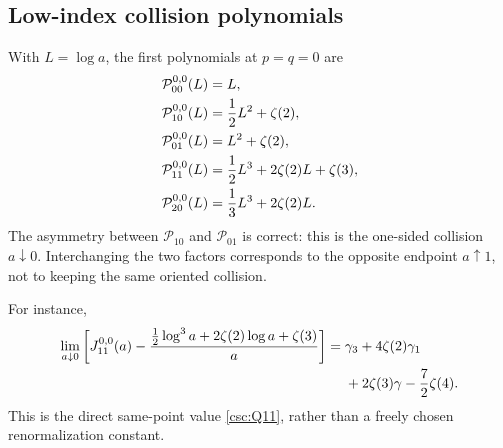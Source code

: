 \documentclass[11pt,a4paper]{article}
\numberwithin{equation}{section}
\theoremstyle{definition}
\begin{document}
\subsection{Low-index collision polynomials}
With $L=\log a$, the first polynomials at $p=q=0$ are
\begin{align}
\mathcal P_{00}^{0,0}(L)&=L,\label{csc:Pexamples}\\
\mathcal P_{10}^{0,0}(L)&=\frac12L^2+\zeta(2),\notag\\
\mathcal P_{01}^{0,0}(L)&=L^2+\zeta(2),\notag\\
\mathcal P_{11}^{0,0}(L)&=\frac12L^3+2\zeta(2)L+\zeta(3),\notag\\
\mathcal P_{20}^{0,0}(L)&=\frac13L^3+2\zeta(2)L.\notag
\end{align}
The asymmetry between $\mathcal P_{10}$ and $\mathcal P_{01}$ is correct: this is the one-sided collision $a\downarrow0$. Interchanging the two factors corresponds to the opposite endpoint $a\uparrow1$, not to keeping the same oriented collision.

For instance,
\begin{align}
\lim_{a\downarrow0}\bigg[J_{11}^{0,0}(a)
-\frac{\tfrac12\log^3a+2\zeta(2)\log a+\zeta(3)}a\bigg]
={}&\gamma_3+4\zeta(2)\gamma_1\notag\\
&+2\zeta(3)\gamma-\frac72\zeta(4).\label{csc:J11limit}
\end{align}
This is the direct same-point value \eqref{csc:Q11}, rather than a freely chosen renormalization constant.
\end{document}
